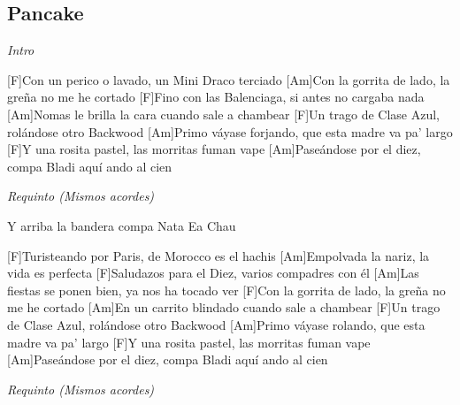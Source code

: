 \subsection{Pancake}

\noindent
\vspace{1cm}

\begin{guitar}
	\begin{multicols}{2}

		\textit{Intro } 

		[F]Con un perico o lavado, un Mini Draco terciado
		[Am]Con la gorrita de lado, la greña no me he cortado
		[F]Fino con las Balenciaga, si antes no cargaba nada
		[Am]Nomas le brilla la cara cuando sale a chambear
		[F]Un trago de Clase Azul, rolándose otro Backwood
		[Am]Primo váyase forjando, que esta madre va pa' largo
		[F]Y una rosita pastel, las morritas fuman vape
		[Am]Paseándose por el diez, compa Bladi aquí ando al cien

		\textit{Requinto (Mismos acordes)}

		Y arriba la bandera compa Nata
		Ea
		Chau

		[F]Turisteando por Paris, de Morocco es el hachis
		[Am]Empolvada la nariz, la vida es perfecta
		[F]Saludazos para el Diez, varios compadres con él
		[Am]Las fiestas se ponen bien, ya nos ha tocado ver
		[F]Con la gorrita de lado, la greña no me he cortado
		[Am]En un carrito blindado cuando sale a chambear
		[F]Un trago de Clase Azul, rolándose otro Backwood
		[Am]Primo váyase rolando, que esta madre va pa' largo
		[F]Y una rosita pastel, las morritas fuman vape
		[Am]Paseándose por el diez, compa Bladi aquí ando al cien

		\textit{Requinto (Mismos acordes)}
	\end{multicols}
\end{guitar}
